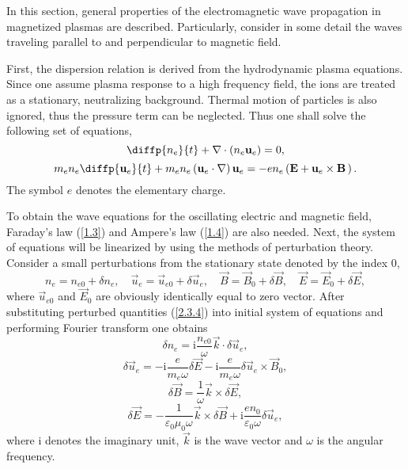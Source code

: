 In this section, general properties of the electromagnetic wave propagation in magnetized plasmas are described. Particularly, consider in some detail the waves traveling parallel to and perpendicular to magnetic field. 

First, the dispersion relation is derived from the hydrodynamic plasma equations. Since one assume plasma response to a high frequency field, the ions are treated as a stationary, neutralizing background. Thermal motion of particles is also ignored, thus the pressure term can be neglected. Thus one shall solve the following set of equations,
\begin{equation}
\label{2.3.1}
\diffp{n_e}{t} + \nabla \cdot \left(n_e \vec{u}_e \right) = 0,
\end{equation}
\begin{equation}
\label{2.3.2}
m_e n_e \diffp{\vec{u}_e}{t} + m_e n_e\left(\vec{u}_e \cdot \nabla \right) \vec{u}_e = - e n_e \left(\vec{E} + \vec{u}_e \times \vec{B} \, \right).
\end{equation}
The symbol $ e $ denotes the elementary charge. 

To obtain the wave equations for the oscillating electric and magnetic field, Faraday's law (\ref{1.3}) and Ampere's law (\ref{1.4}) are also needed. Next, the system of equations will be linearized by using the methods of perturbation theory. Consider a small perturbations from the stationary state denoted by the index $ 0 $,
\begin{equation}
\label{2.3.4}
n_{e} = n_{e0} + \delta n_{e}, \quad \vec{u}_{e} = \vec{u}_{e0} + \delta \vec{u}_{e}, \quad \vec{B} = \vec{B}_{0} + \delta \vec{B}, \quad \vec{E} = \vec{E}_{0} + \delta \vec{E},
\end{equation}
where $ \vec{u}_{e0} $ and $ \vec{E}_{0} $ are obviously identically equal to zero vector. After substituting perturbed quantities (\ref{2.3.4}) into initial system of equations and performing Fourier transform one obtains
\begin{equation}
\label{2.3.5}
\delta n_{e} = \mathrm{i} \frac{n_{e0}}{\omega} \vec{k} \cdot \delta \vec{u}_{e},
\end{equation}
\begin{equation}
\label{2.3.6}
\delta \vec{u}_{e} = - \mathrm{i} \frac{e}{m_{e} \omega} \delta \vec{E} - \mathrm{i} \frac{e}{m_{e} \omega} \delta \vec{u}_{e} \times \vec{B}_{0},
\end{equation}
\begin{equation}
\label{2.3.7}
\delta \vec{B} = \frac{1}{\omega} \vec{k} \times \delta \vec{E},
\end{equation}
\begin{equation}
\label{2.3.8}
\delta \vec{E} = - \frac{1}{\varepsilon_{0} \mu_{0} \omega} \vec{k} \times \delta \vec{B} + \mathrm{i} \frac{e n_{0}}{\varepsilon_{0} \omega} \delta \vec{u}_{e},
\end{equation}
where $ \mathrm{i} $ denotes the imaginary unit, $ \vec{k} $ is the wave vector and $ \omega $ is the angular frequency.

